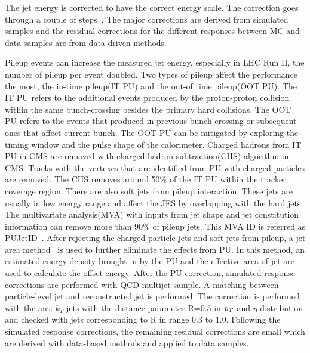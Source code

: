 The jet energy is corrected to have the correct energy scale.  The correction goes through a couple of steps~\cite{jetenergycorrection}. The major corrections are derived from simulated samples and the residual corrections for the different responses between MC and data samples are from data-driven methods. 

Pileup events can increase the measured jet energy, especially in LHC Run II, the number of pileup per event doubled. Two types of pileup affect the performance the most, the in-time pileup(IT PU) and the out-of time pileup(OOT PU). The IT PU refers to the additional events produced by the proton-proton collision within the same bunch-crossing besides the primary hard collisions. The OOT PU refers to the events that produced in previous bunch crossing or subsequent ones that affect current bunch. The OOT PU can be mitigated by exploring the timing window and the pulse shape of the calorimeter. Charged hadrons from IT PU in CMS are removed with charged-hadron subtraction(CHS) algorithm in CMS. Tracks with the vertexes that are identified from PU with charged particles are removed. The CHS removes around 50\% of the IT PU within the tracker coverage region. There are also soft jets from pileup interaction. These jets are usually in low energy range and affect the JES by overlapping with the hard jets. The multivariate analysis(MVA) with inputs from jet shape and jet constitution information can remove more than 90\% of pileup jets. This MVA ID is referred as PUJetID~\cite{PU_jetID}. After rejecting the charged particle jets and soft jets from pileup, a jet area method~\cite{FastJetalso} is used to further eliminate the effects from PU. In this method, an estimated energy density brought in by the PU and the effective area of jet are used to calculate the offset energy. After the PU correction, simulated response corrections are performed with QCD multijet sample. A matching between particle-level jet and reconstructed jet is performed. The correction is performed with the anti-$k_{T}$ jets with the distance parameter R=0.5 in $p_{T}$ and $
\eta$ distribution and checked with jets corresponding to R in range 0.3 to 1.0. Following the simulated response corrections, the remaining residual corrections are small which are derived with data-based methods and applied to data samples.


